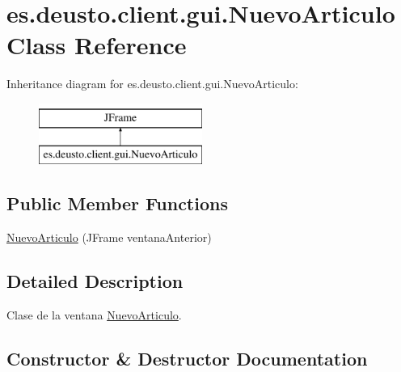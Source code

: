 \hypertarget{classes_1_1deusto_1_1client_1_1gui_1_1_nuevo_articulo}{}\section{es.\+deusto.\+client.\+gui.\+Nuevo\+Articulo Class Reference}
\label{classes_1_1deusto_1_1client_1_1gui_1_1_nuevo_articulo}
Inheritance diagram for es.\+deusto.\+client.\+gui.\+Nuevo\+Articulo\+:\begin{figure}[H]
\begin{center}
\leavevmode
\includegraphics[height=2.000000cm]{classes_1_1deusto_1_1client_1_1gui_1_1_nuevo_articulo}
\end{center}
\end{figure}
\subsection*{Public Member Functions}
\begin{DoxyCompactItemize}
\item 
\mbox{\hyperlink{classes_1_1deusto_1_1client_1_1gui_1_1_nuevo_articulo_a9ba555e8b1ea4833a1b37726aa39bc00}{Nuevo\+Articulo}} (J\+Frame ventana\+Anterior)
\end{DoxyCompactItemize}


\subsection{Detailed Description}
Clase de la ventana \mbox{\hyperlink{classes_1_1deusto_1_1client_1_1gui_1_1_nuevo_articulo}{Nuevo\+Articulo}}. 

\subsection{Constructor \& Destructor Documentation}
\mbox{\label{classes_1_1deusto_1_1client_1_1gui_1_1_nuevo_articulo_a9ba555e8b1ea4833a1b37726aa39bc00}} 
